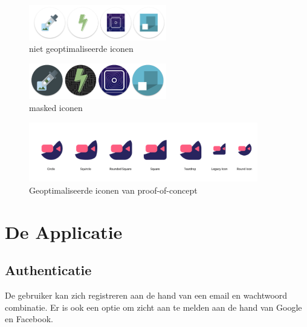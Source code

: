 		\begin{figure}[H]
			\centering
			\includegraphics[width=60mm]{./img/traditionalIcons}{}
			\caption{niet geoptimaliseerde iconen}
		\end{figure}
		\begin{figure}[H]
			\centering
			\includegraphics[width=60mm]{./img/maskedicons}{}
			\caption{masked iconen}
		\end{figure}
		\begin{figure}[H]
			\centering
			\includegraphics[width=100mm]{./img/iconPWA.png}{}
			\caption{Geoptimaliseerde iconen van proof-of-concept}
		\end{figure}


\section{De Applicatie}
	\subsection{Authenticatie}
		De gebruiker kan zich registreren aan de hand van een email en wachtwoord combinatie. Er is ook een optie om zicht aan te melden aan de hand van Google en Facebook.
		
